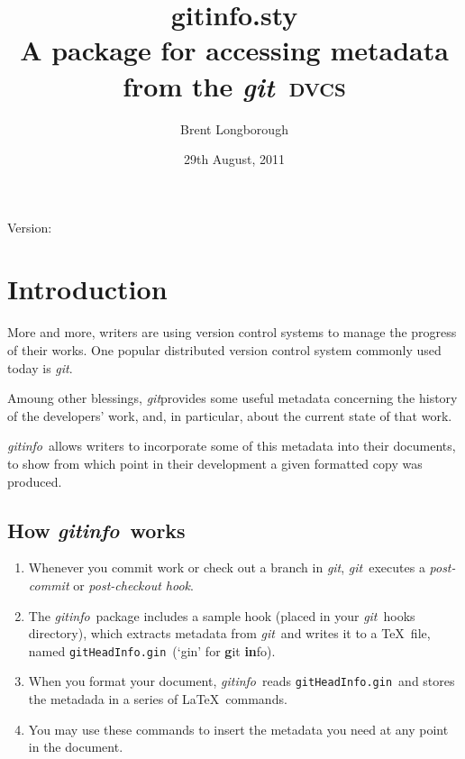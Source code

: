 \documentclass[a4paper,12pt,twoside,openany]{memoir}
\newcommand{\sfit}[1]{\textit{#1}}
\newcommand{\git}{\sfit{git}}
\newcommand{\tpname}{\sfit{gitinfo}}
\newcommand{\tpfname}{\textsf{gitinfo.sty}}
\newcommand{\ginname}{gitHeadInfo.gin}
\newcommand{\metaname}{\texttt{\ginname}}
\begin{document}
\title{%
	\Huge \tpfname\\[2ex]%
	\Large A package for accessing metadata\\from the \git\ \textsc{dvcs}
	}
\author{Brent Longborough}
\date{29th August, 2011}
\maketitle

{\centering
Version:\gitVtagn\\
}
\begingroup
{}
\setlength{\afterchapskip}{20pt}
\let\clearpage\relax
\let\chaptitlefont\Large\bfseries
\vspace*{5\baselineskip}
\tableofcontents*
\clearpage
\endgroup
\chapter{Introduction}
More and more, writers are using version control systems
to manage the progress of their works.
One popular distributed version control system commonly used today
is \git.

Amoung other blessings, \git provides
some useful metadata concerning the history of the developers'
work, and, in particular, about the current state of that work.

\tpname\ allows writers to incorporate some of this metadata
into their documents, to show from which point in their development
a given formatted copy was produced.

\section{How \tpname\ works}
\begin{enumerate}
\item Whenever you commit work or check out a branch in \git,
\git\ executes a \textit{post-commit} or \textit{post-checkout hook}.
\item The \tpname\ package includes a sample hook
(placed in your \git\ hooks directory),
which extracts metadata from \git\ and writes it to a \TeX\ file,
named \metaname\ (`gin' for \textbf{g}it \textbf{in}fo).
\item When you format your document, \tpname\ reads 
\metaname\ and stores the metadada
in a series of \LaTeX\ commands.
\item You may use these commands to insert
the metadata you need at any point in the document.
\end{enumerate}
\end{document}
